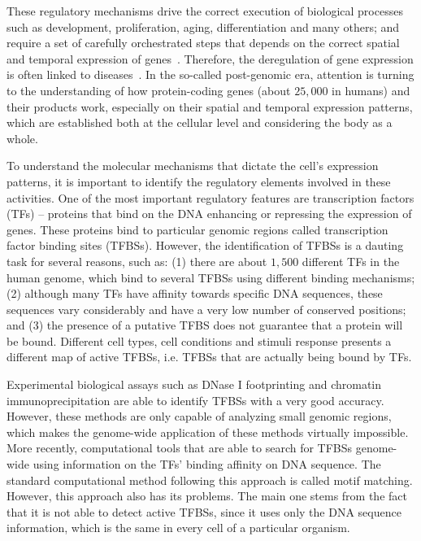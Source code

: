 These regulatory mechanisms drive the correct execution of biological processes such as development, proliferation, aging, differentiation and many others; and require a set of carefully orchestrated steps that depends on the correct spatial and temporal expression of genes~\cite{maston2006}. Therefore, the deregulation of gene expression is often linked to diseases~\cite{encode2012}. In the so-called post-genomic era, attention is turning to the understanding of how protein-coding genes (about $25,000$ in humans) and their products work, especially on their spatial and temporal expression patterns, which are established both at the cellular level and considering the body as a whole\cite{maston2006}.

To understand the molecular mechanisms that dictate the cell's expression patterns, it is important to identify the regulatory elements involved in these activities. One of the most important regulatory features are transcription factors (TFs) -- proteins that bind on the DNA enhancing or repressing the expression of genes. These proteins bind to particular genomic regions called transcription factor binding sites (TFBSs). However, the identification of TFBSs is a dauting task for several reasons, such as: (1) there are about $1,500$ different TFs in the human genome, which bind to several TFBSs using different binding mechanisms; (2) although many TFs have affinity towards specific DNA sequences, these sequences vary considerably and have a very low number of conserved positions; and (3) the presence of a putative TFBS does not guarantee that a protein will be bound. Different cell types, cell conditions and stimuli response presents a different map of active TFBSs, i.e. TFBSs that are actually being bound by TFs.

Experimental biological assays such as DNase I footprinting and chromatin immunoprecipitation are able to identify TFBSs with a very good accuracy. However, these methods are only capable of analyzing small genomic regions, which makes the genome-wide application of these methods virtually impossible. More recently, computational tools that are able to search for TFBSs genome-wide using information on the TFs' binding affinity on DNA sequence. The standard computational method following this approach is called motif matching. However, this approach also has its problems. The main one stems from the fact that it is not able to detect active TFBSs, since it uses only the DNA sequence information, which is the same in every cell of a particular organism.

